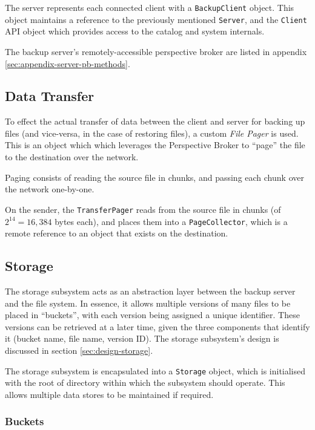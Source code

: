 The server represents each connected client with a \verb!BackupClient! object.
This object maintains a reference to the previously mentioned \verb!Server!,
and the \verb!Client! API object which provides access to the catalog and
system internals.

The backup server's remotely-accessible perspective broker are listed in
appendix \ref{sec:appendix-server-pb-methods}.

\subsection{Data Transfer}
\label{sec:data-transfer}

To effect the actual transfer of data between the client and server for backing
up files (and vice-versa, in the case of restoring files), a custom \emph{File
Pager} is used. This is an object which which leverages the Perspective Broker
to ``page'' the file to the destination over the network.

Paging consists of reading the source file in chunks, and passing each chunk
over the network one-by-one.

On the sender, the \verb!TransferPager! reads from the source file in chunks
(of $2^{14} = 16,384$ bytes each), and places them into a \verb!PageCollector!,
which is a remote reference to an object that exists on the destination.

\subsection{Storage}
\label{sec:implementation-storage}

The storage subsystem acts as an abstraction layer between the backup server
and the file system. In essence, it allows multiple versions of many files to
be placed in ``buckets'', with each version being assigned a unique identifier.
These versions can be retrieved at a later time, given the three components
that identify it (bucket name, file name, version ID). The storage subsystem's
design is discussed in section \ref{sec:design-storage}.

The storage subsystem is encapsulated into a \verb!Storage! object, which is
initialised with the root of directory within which the subsystem should
operate. This allows multiple data stores to be maintained if required.

\subsubsection{Buckets}

